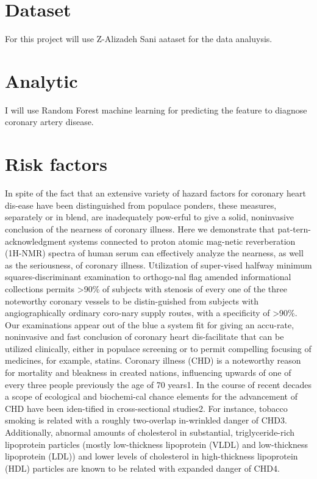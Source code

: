 \documentclass[sigconf]{acmart}
\begin{document}
\section{Dataset}
For this project  will use Z-Alizadeh Sani aataset for the data analuysis.
    
\section{Analytic}
    I will use Random Forest machine learning for predicting the feature to diagnose coronary artery disease.

\section{Risk factors}
\par In spite of the fact that an extensive variety of hazard factors for coronary heart dis-ease have been distinguished from populace ponders, these measures, separately or in blend, are inadequately pow-erful to give a solid, noninvasive conclusion of the nearness of coronary illness. Here we demonstrate that pat-tern-acknowledgment systems connected to proton atomic mag-netic reverberation (1H-NMR) spectra of human serum can effectively analyze the nearness, as well as the seriousness, of coronary illness. Utilization of super-vised halfway minimum squares-discriminant examination to orthogo-nal flag amended informational collections permits >90\% of subjects with stenosis of every one of the three noteworthy coronary vessels to be distin-guished from subjects with angiographically ordinary coro-nary supply routes, with a specificity of >90\%. Our examinations appear out of the blue a system fit for giving an accu-rate, noninvasive and fast conclusion of coronary heart dis-facilitate that can be utilized clinically, either in populace screening or to permit compelling focusing of medicines, for example, statins.
Coronary illness (CHD) is a noteworthy reason for mortality and bleakness in created nations, influencing upwards of one of every three people previously the age of 70 years1. In the course of recent decades a scope of ecological and biochemi-cal chance elements for the advancement of CHD have been iden-tified in cross-sectional studies2. For instance, tobacco smoking is related with a roughly two-overlap in-wrinkled danger of CHD3. Additionally, abnormal amounts of cholesterol in substantial, triglyceride-rich lipoprotein particles (mostly low-thickness lipoprotein (VLDL) and low-thickness lipoprotein (LDL)) and lower levels of cholesterol in high-thickness lipoprotein (HDL) particles are known to be related with expanded danger of CHD4.
\end{document}
